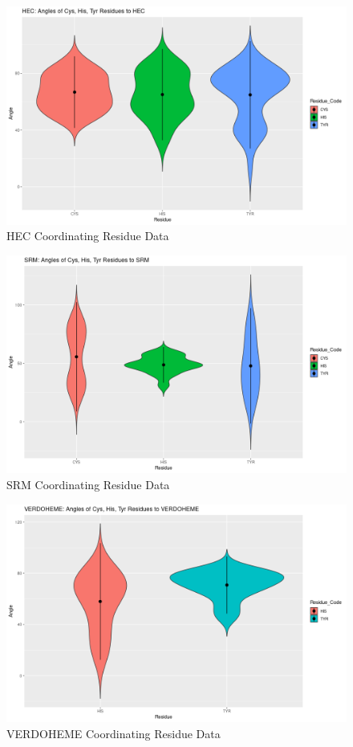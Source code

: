	\begin{figure}
		\caption{HEC Coordinating Residue Data}
		\label{figs:HEC_coordRes7}
		\includegraphics[width=\linewidth]{7A/HEC_coordRes}
	\end{figure}	
		
	\begin{figure}
		\caption{SRM Coordinating Residue Data}
		\label{figs:SRM_coordRes7}
		\includegraphics[width=\linewidth]{7A/SRM_coordRes}
	\end{figure}
		
	\begin{figure}
		\caption{VERDOHEME Coordinating Residue Data}
		\label{figs:VERDOHEME_coordRes7}
		\includegraphics[width=\linewidth]{7A/VERDOHEME_coordRes}
	\end{figure}


